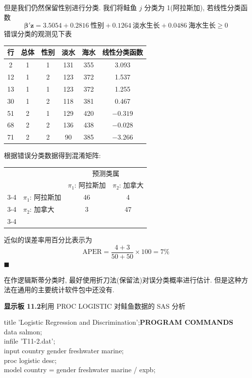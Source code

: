 
但是我们仍然保留性别进行分类. 我们将鲑鱼 $j$ 分类为 1(阿拉斯加), 若线性分类函数
\[
\boldsymbol{\beta}'\mathbf{z}=3.5054+0.2816\ \text{性别}+0.1264\ \text{淡水生长}+0.0486\ \text{海水生长}\ge 0
\]
错误分类的观测见下表

\begin{mvtable}
\begin{tabular}{cccccc}
\toprule
行 & 总体 & 性别 & 淡水 & 海水 & 线性分类函数 \\
\midrule
2 & 1 & 1 & 131 & 355 & 3.093 \\
12 & 1 & 2 & 123 & 372 & 1.537 \\
13 & 1 & 1 & 123 & 372 & 1.255 \\
30 & 1 & 2 & 118 & 381 & 0.467 \\
51 & 2 & 1 & 129 & 420 & $-0.319$ \\
68 & 2 & 2 & 136 & 438 & $-0.028$ \\
71 & 2 & 2 & 90 & 385 & $-3.266$ \\
\bottomrule
\end{tabular}
\end{mvtable}

根据错误分类数据得到混淆矩阵:

\begin{mvtable}
\begin{tabular}{c|l|c|c|}
\multicolumn{2}{c}{} & \multicolumn{2}{c}{预测类属}\\
\multicolumn{2}{c}{} & \multicolumn{1}{c}{$\pi_1$: 阿拉斯加} & \multicolumn{1}{c}{$\pi_2$: 加拿大}\\ \cline{3-4}
\multirow{2}{*}{实际类属} & $\pi_1$: 阿拉斯加 & 46 & 4 \\ \cline{3-4}
 & $\pi_2$: 加拿大 & 3 & 47 \\ \cline{3-4}
\end{tabular}
\end{mvtable}

近似的误差率用百分比表示为
\[
\mathrm{APER}=\frac{4+3}{50+50}\times 100=7\%
\]
\hfill$\blacksquare$

在作逻辑斯蒂分类时, 最好使用折刀法(保留法)对误分类概率进行估计. 但是这种方法在通用的主要统计软件包中还没有.

\medskip
\noindent\textbf{显示板 11.2}\quad 利用 PROC LOGISTIC 对鲑鱼数据的 SAS 分析

\begin{mvbox}
{\ttfamily\small
title 'Logistic Regression and Discrimination';\hfill\textbf{\rmfamily PROGRAM COMMANDS}\\
data salmon;\\
infile 'T11-2.dat';\\
input country gender freshwater marine;\\
proc logistic desc;\\
model country = gender freshwater marine / expb;
\par}
\end{mvbox}

